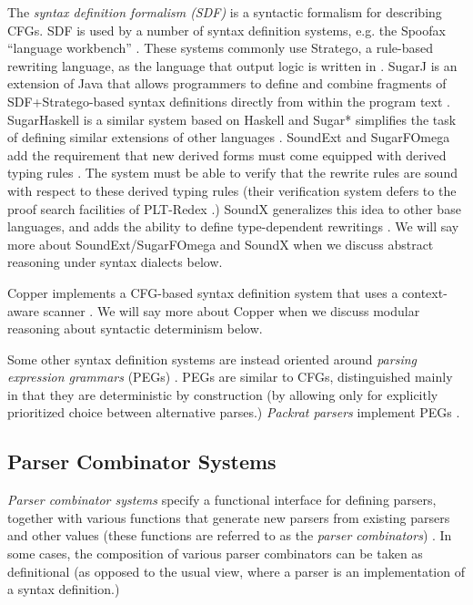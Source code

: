The \emph{syntax definition formalism  (SDF)}  \cite{journals/sigplan/HeeringHKR89} is a syntactic formalism for describing CFGs. SDF is used by a number of syntax definition systems, e.g. the Spoofax ``language workbench'' \cite{kats2010spoofax}. These systems commonly use Stratego, a rule-based rewriting language, as the language that output logic is written in \cite{Visser-RTA01}. SugarJ is an extension of Java that allows programmers to define and combine fragments of SDF+Stratego-based syntax definitions directly from within the program text \cite{erdweg2011sugarj}. SugarHaskell is a similar system based on Haskell \cite{erdweg2012layout} and Sugar* simplifies the task of defining similar extensions of other languages \cite{erdweg2013framework}. SoundExt and SugarFOmega add the requirement that new derived forms must come equipped with  derived typing rules \cite{conf/icfp/LorenzenE13}. The system must be able to verify that the rewrite rules are sound with respect to these derived typing rules (their verification system defers to the proof search facilities of PLT-Redex \cite{Felleisen-Findler-Flatt09}.) SoundX generalizes this idea to other base languages, and adds the ability to define type-dependent rewritings \cite{conf/popl/LorenzenE16}. We will say more about SoundExt/SugarFOmega and SoundX when we discuss abstract reasoning under syntax dialects below.


Copper implements a CFG-based syntax definition system that uses a context-aware scanner \cite{conf/gpce/WykS07}. We will say more about Copper when we discuss modular reasoning about syntactic determinism below.%


Some other syntax definition systems are instead oriented  around \emph{parsing expression grammars} (PEGs) \cite{Ford04a}. PEGs are similar to CFGs, distinguished mainly in that they are deterministic by construction (by allowing only for explicitly prioritized choice between alternative parses.) \emph{Packrat parsers} implement PEGs \cite{DBLP:journals/corr/abs-cs-0603077}.

\subsection{Parser Combinator Systems}\label{sec:parser-combinators}
\emph{Parser combinator systems} specify a functional interface for defining parsers, together with various functions that generate new parsers from existing parsers and other values (these functions are referred to as the \emph{parser combinators}) \cite{Hutton1992d}. 
In some cases, the composition of various parser combinators can be taken as definitional (as opposed to the usual view, where a parser is an {implementation} of a syntax definition.)


